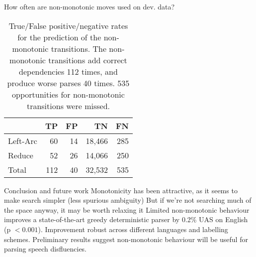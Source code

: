 \documentclass{lecture}
\begin{document}
\begin{plain}{How often are non-monotonic moves used on dev. data?}
\begin{table}
    \centering
    \small
    \begin{tabular}{l|rrrr}
\hline
         & TP  &  FP & TN     & FN \\
\hline \hline
Left-Arc & 60  & 14  & 18,466 & 285 \\
Reduce   & 52  & 26  & 14,066 & 250  \\
Total    & 112 & 40  & 32,532  & 535 \\
\hline
\end{tabular}
\caption{\small
    True/False positive/negative rates for the prediction of the non-monotonic
    transitions. The non-monotonic transitions add
    correct dependencies 112 times, and produce worse parses 40 times.
    535 opportunities for non-monotonic transitions were missed.
\label{tab:confusions}}
\end{table}
\end{plain}

\begin{points}{Conclusion and future work}
    \p Monotonicity has been attractive, as it seems to make search simpler
       (less spurious ambiguity)
    \p But if we're not searching much of the space anyway, it may be worth
       relaxing it
       \vspace{0.2in}
    \p Limited non-monotonic behaviour improves a state-of-the-art greedy
    deterministic parser by 0.2\% UAS on English (p $< 0.001$).
    \p Improvement robust across different languages and labelling schemes.
    \vspace{0.2in}
    \p Preliminary results suggest non-monotonic behaviour will be useful for
       parsing speech disfluencies.
\end{points}
\end{document}
